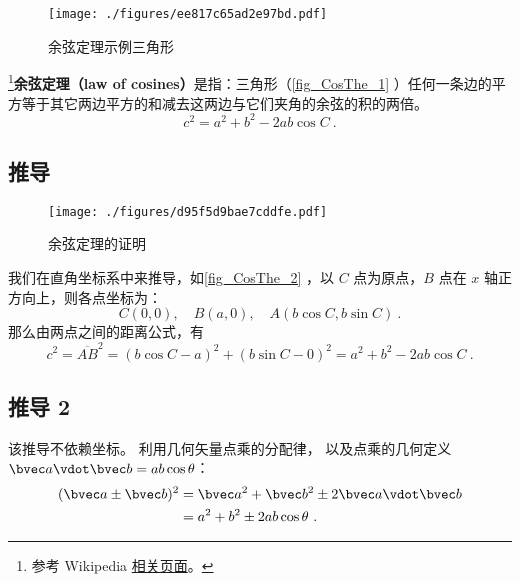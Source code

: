
\begin{figure}[ht]
\centering
\texttt{[image: ./figures/ee817c65ad2e97bd.pdf]}
\caption{余弦定理示例三角形} \label{fig_CosThe_1}
\end{figure}

\footnote{参考 Wikipedia \href{https://en.wikipedia.org/wiki/Law_of_cosines}{相关页面}。}\textbf{余弦定理（law of cosines）}是指：三角形（\autoref{fig_CosThe_1} ）任何一条边的平方等于其它两边平方的和减去这两边与它们夹角的余弦的积的两倍。
\begin{equation}\label{eq_CosThe_1}
c^2=a^2 + b^2 - 2ab\cos C~.
\end{equation}


\subsection{推导}
\begin{figure}[ht]
\centering
\texttt{[image: ./figures/d95f5d9bae7cddfe.pdf]}
\caption{余弦定理的证明} \label{fig_CosThe_2}
\end{figure}
我们在直角坐标系中来推导，如\autoref{fig_CosThe_2} ，以 $C$ 点为原点，$B$ 点在 $x$ 轴正方向上，则各点坐标为：
\begin{equation}
C(0,0),\quad B(a,0),\quad A(b\cos C,b\sin C)~.
\end{equation}
那么由两点之间的距离公式，有
\begin{equation}
c^2=\overline{AB}^2=(b\cos C-a)^2+(b\sin C-0)^2=a^2+b^2-2ab\cos C~.
\end{equation}

\subsection{推导 2}
该推导不依赖坐标。 利用几何矢量点乘的分配律， 以及点乘的几何定义 $\bvec a \vdot \bvec b = ab\cos\theta$：
\begin{equation}\label{eq_CosThe_2}
\begin{aligned}
(\bvec a \pm \bvec b)^2 &= \bvec a^2 + \bvec b^2 \pm 2\bvec a \vdot \bvec b\\
&= a^2 + b^2 \pm 2ab \cos\theta~.
\end{aligned}
\end{equation}
